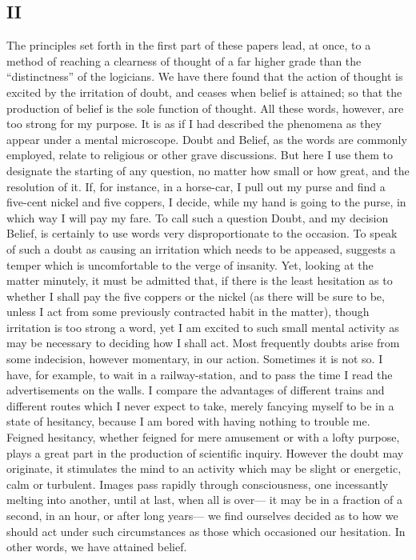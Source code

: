 \subsection*{II}

The principles set forth in the first part of these papers lead, at once, to a method of reaching a clearness of thought of a far higher grade than the ``distinctness'' of the logicians. We have there found that the action of thought is excited by the irritation of doubt, and ceases when belief is attained; so that the production of belief is the sole function of thought. All these words, however, are too strong for my purpose. It is as if I had described the phenomena as they appear under a mental microscope. Doubt and Belief, as the words are commonly employed, relate to religious or other grave discussions. But here I use them to designate the starting of any question, no matter how small or how great, and the resolution of it. If, for instance, in a horse-car, I pull out my purse and find a five-cent nickel and five coppers, I decide, while my hand is going to the purse, in which way I will pay my fare. To call such a question Doubt, and my decision Belief, is certainly to use words very disproportionate to the occasion. To speak of such a doubt as causing an irritation which needs to be appeased, suggests a temper which is uncomfortable to the verge of insanity. Yet, looking at the matter
minutely, it must be admitted that, if there is the least hesitation as to whether I shall pay the five coppers or the nickel (as there will be sure to be, unless I act  from some previously contracted habit in the matter), though irritation is too strong a word, yet I am excited to such small mental activity as may be necessary to deciding how I shall act. Most frequently doubts arise from some indecision, however momentary, in our action. Sometimes it is not so. I have, for example, to wait in a railway-station, and to pass the time I read the advertisements on the walls. I compare the advantages of different trains and different routes which I never expect to take, merely fancying myself to be in a state of hesitancy, because I am bored with having nothing to trouble me. Feigned hesitancy, whether feigned for mere amusement or with a lofty purpose, plays a great part in the production of scientific inquiry. However the doubt may originate, it stimulates the mind to an activity which may be slight or energetic, calm or turbulent. Images pass rapidly through consciousness, one incessantly melting into another, until at last, when all is over--- it may be in a fraction of a second, in an hour, or after long years--- we find ourselves decided as to how we should act under
such circumstances as those which occasioned our hesitation. In other words, we have attained belief.
 

